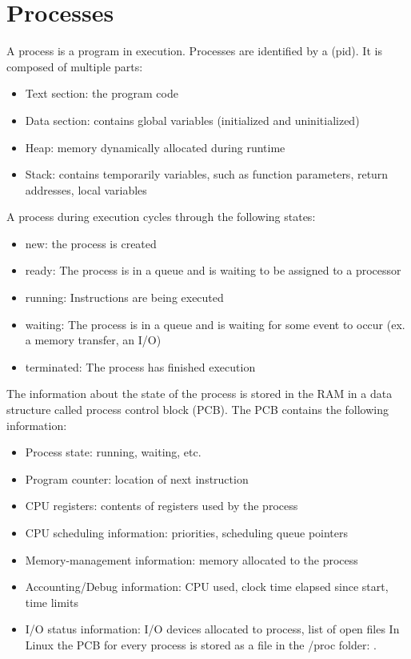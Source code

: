 \chapter{Processes}

A process is a program in execution. Processes are identified by a  (pid). It is composed of multiple parts:

\begin{itemize}
  \item Text section: the program code
  \item Data section: contains global variables (initialized and uninitialized)
  \item Heap: memory dynamically allocated during runtime
  \item Stack: contains temporarily variables, such as function parameters, return addresses, local variables
\end{itemize}


A process during execution cycles through the following states:

\begin{itemize}
  \item new: the process is created
  \item ready: The process is in a queue and is waiting to be assigned to a processor
  \item running: Instructions are being executed
  \item waiting: The process is in a queue and is waiting for some event to occur (ex. a memory transfer, an I/O)
  \item terminated: The process has finished execution
\end{itemize}


The information about the state of the process is stored in the RAM in a data structure called process control block (PCB). The PCB contains the following information:

\begin{itemize}
  \item Process state: running, waiting, etc.
  \item Program counter: location of next instruction
  \item CPU registers: contents of registers used by the process
  \item CPU scheduling information: priorities, scheduling queue pointers
  \item Memory-management information: memory allocated to the process
  \item Accounting/Debug information: CPU used, clock time elapsed since start, time limits
  \item I/O status information: I/O devices allocated to process, list of open files
  In Linux the PCB for every process is stored as a file in the /proc folder: .
\end{itemize}

